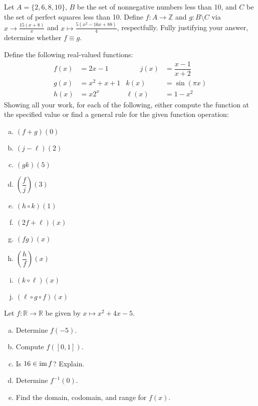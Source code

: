 \documentclass[11pt,letterpaper]{article}
\begin{document}

 Let $A= \{ 2, 6, 8, 10 \}$, $B$ be the set of nonnegative numbers less than 10, and $C$ be the set of perfect squares less than 10. Define $f: A \to \mathbb{Z}$ and $g: B \setminus C$ via $x \to \frac{15(x + 8)}{x}$ and $x \mapsto \frac{5(x^2 - 16x + 88)}{4}$, respectfully. Fully justifying your answer, determine whether $f \equiv g$. 



\newpage



 Define the following real-valued functions:
	\[
	\begin{aligned}
	f(x)&= 2x - 1 &\qquad j(x)&= \dfrac{x - 1}{x + 2} \\
	g(x)&= x^2 + x + 1 & k(x)&= \sin(\pi x) \\
	h(x)&= x 2^x & \ell(x)&= 1 - x^2
	\end{aligned}
	\]
Showing all your work, for each of the following, either compute the function at the specified value or find a general rule for the given function operation:
	\begin{enumerate}[(a)]
	\item $(f + g)(0)$
	\item $(j - \ell)(2)$
	\item $(gk)(5)$
	\item $\left( \dfrac{f}{j} \right) (3)$
	\item $(h \circ k)(1)$
	\item $(2f + \ell)(x)$
	\item $(fg)(x)$
	\item $\left( \dfrac{h}{f} \right)(x)$
	\item $(k \circ \ell)(x)$
	\item $(\ell \circ g \circ f)(x)$
	\end{enumerate}



\newpage



 Let $f: \mathbb{R} \to \mathbb{R}$ be given by $x \mapsto x^2 + 4x - 5$.
	\begin{enumerate}[(a)]
	\item Determine $f(-5)$.
	\item Compute $f([0,1])$.
	\item Is $16 \in \operatorname{im} f$? Explain. 
	\item Determine $f^{-1}(0)$.
	\item Find the domain, codomain, and range for $f(x)$. 
	\end{enumerate}
\end{document}

